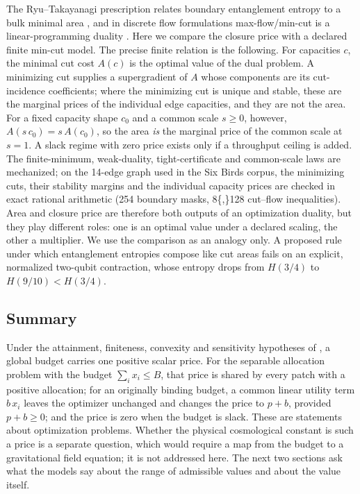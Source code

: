The Ryu--Takayanagi prescription relates boundary entanglement entropy
to a bulk minimal area \citep{RyuTakayanagi2006}, and in discrete flow
formulations max-flow/min-cut is a linear-programming duality
\citep{FreedmanHeadrick2017}. Here we compare the closure price with a
declared finite min-cut model. The precise finite relation is the
following. For capacities \(c\), the minimal cut cost \(A(c)\) is the
optimal value of the dual problem. A minimizing cut supplies a
supergradient of \(A\) whose components are its cut-incidence
coefficients; where the minimizing cut is unique and stable, these are
the marginal prices of the individual edge capacities, and they are not
the area. For a fixed capacity shape \(c_0\) and a common scale
\(s\ge0\), however, \(A(s\,c_0)=s\,A(c_0)\), so the area \emph{is} the
marginal price of the common scale at \(s=1\). A slack regime with zero
price exists only if a throughput ceiling is added. The finite-minimum,
weak-duality, tight-certificate and common-scale laws are mechanized; on
the 14-edge graph used in the Six Birds corpus, the minimizing cuts,
their stability margins and the individual capacity prices are checked
in exact rational arithmetic (254 boundary masks, 8\{,\}128 cut--flow
inequalities). Area and closure price are therefore both outputs of an
optimization duality, but they play different roles: one is an optimal
value under a declared scaling, the other a multiplier. We use the
comparison as an analogy only. A proposed rule under which entanglement
entropies compose like cut areas fails on an explicit, normalized
two-qubit contraction, whose entropy drops from \(H(3/4)\) to
\(H(9/10)<H(3/4)\).

\hypertarget{summary}{%
\subsection{Summary}\label{summary}}

Under the attainment, finiteness, convexity and sensitivity hypotheses
of , a global budget carries one positive scalar price.
For the separable allocation problem with the budget \(\sum_ix_i\le B\),
that price is shared by every patch with a positive allocation; for an
originally binding budget, a common linear utility term \(b\,x_i\)
leaves the optimizer unchanged and changes the price to \(p+b\),
provided \(p+b\ge0\); and the price is zero when the budget is slack.
These are statements about optimization problems. Whether the physical
cosmological constant is such a price is a separate question, which
would require a map from the budget to a gravitational field equation;
it is not addressed here. The next two sections ask what the models say
about the range of admissible values and about the value itself.
